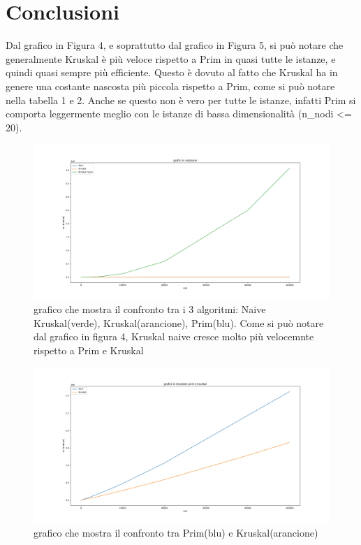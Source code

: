 \section{Conclusioni}
\label{conlusioni}

Dal grafico in Figura 4, e soprattutto dal grafico in Figura 5, si può notare che generalmente Kruskal è più veloce rispetto a Prim in quasi tutte le istanze, e quindi quasi sempre più efficiente. Questo è dovuto al fatto che Kruskal ha in genere una costante nascosta più piccola rispetto a Prim, come si può notare nella tabella 1 e 2.
Anche se questo non è vero per tutte le istanze, infatti Prim si comporta leggermente meglio con le istanze di bassa dimensionalità (n\_nodi <= 20).

\begin{figure}[htbp]
    \centering
    \centerline{\includegraphics[scale = 0.38]{Fig/graficiRelazione.png}}
    \caption{grafico che mostra il confronto tra i 3 algoritmi: Naive Kruskal(verde), Kruskal(arancione), Prim(blu). Come si può notare dal grafico in figura 4, Kruskal naive cresce molto più velocemnte rispetto a Prim e Kruskal}
\end{figure}

\newpage

\begin{figure}[htbp]
    \centering
    \centerline{\includegraphics[scale = 0.38]{Fig/primkruskalrelazione.png}}
    \caption{grafico che mostra il confronto tra Prim(blu) e Kruskal(arancione)}
\end{figure}

